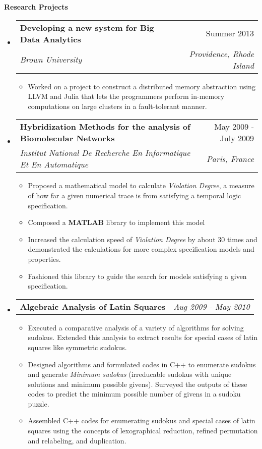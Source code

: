 \documentclass[letterpaper,11pt]{article}
\makeatletter
\newcommand{\resitem}[1]{\item[\ding{226}] #1 \vspace{-2pt}}
\newcommand{\resheading}[1]{{\large \colorbox{mygrey}{\begin{minipage}{\textwidth}{\textbf{#1 \vphantom{p\^{E}}}}\end{minipage}}}}
\newcommand{\ressubheading}[4]{
\begin{tabular*}{7.0in}{l@{\extracolsep{\fill}}r}
		\textbf{#1} & #2 \\
		\textit{#3} & \textit{#4} \\
\end{tabular*}\vspace{-6pt}}
\newcommand{\reslineheading}[2]{
\begin{tabular*}{7.0in}{l@{\extracolsep{\fill}}r}
		\textbf{#1} & #2 \\
\end{tabular*}\vspace{-6pt}}
\makeatother
\begin{document}
\resheading{Research Projects}
\begin{itemize}

\item
	\ressubheading{Developing a new system for Big Data Analytics}{Summer 2013}{Brown University}{Providence, Rhode Island}
	\begin{itemize}
		\resitem{Worked on a project to construct a distributed memory abstraction using LLVM and Julia that lets the programmers perform in-memory computations on large clusters in a fault-tolerant manner.}
	\end{itemize}

\item
	\ressubheading{Hybridization Methods for the analysis of Biomolecular Networks}{May 2009 - July 2009}{Institut National De Recherche En Informatique Et En Automatique}{Paris, France}
	\begin{itemize}
		\resitem{Proposed a mathematical model to calculate \textit{Violation Degree}, a measure of how far a given numerical trace is from satisfying a temporal logic specification. }
        \resitem{Composed a \textbf{MATLAB} library to implement this model}
        \resitem{Increased the calculation speed of \textit{Violation Degree} by about 30 times and demonstrated the calculations for more complex specification models and properties.}
        \resitem{Fashioned this library to guide the search for models satisfying a given specification.}
	\end{itemize}

\item
	\reslineheading{Algebraic Analysis of Latin Squares}{\textit{Aug 2009 - May 2010}}
	\begin{itemize}
        \resitem{Executed a comparative analysis of a variety of algorithms for solving sudokus. Extended this analysis to extract results for special cases of latin squares like symmetric sudokus.}
        \resitem{Designed algorithms and formulated codes in C++ to enumerate sudokus and generate \textit{Minimum sudokus} (irreducable sudokus with unique solutions and minimum possible givens). Surveyed the outputs of these codes to predict the minimum possible number of givens in a sudoku puzzle.}
        \resitem{Assembled C++ codes for enumerating sudokus and special cases of latin squares using the concepts of lexographical reduction, refined permutation and relabeling, and duplication.}
	\end{itemize}

\end{itemize}
\end{document}

